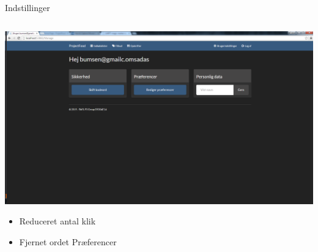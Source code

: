 \begin{frame}{Indstillinger}

	
	\begin{minipage}[0.3\textheight]{\textwidth}
	\begin{columns}[T]
	\begin{column}{1\textwidth}
	
	\vspace{-15 pt}
	 \includegraphics[width=1\textwidth,height=1\textheight,keepaspectratio, trim={1cm 0 0 16mm}, clip]{images/Screenshots/SettingsOld.png}
	 
	 \begin{itemize}
	 		 	\item Reduceret antal klik
	 		 	\item Fjernet ordet Præferencer
	 \end{itemize}
	
	\end{column}

	\end{columns}

  \end{minipage}
	
\end{frame}
